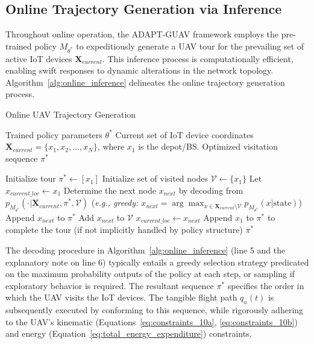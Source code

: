 \documentclass[10pt,conference,letterpaper]{IEEEtran}
\begin{document}
\subsection{Online Trajectory Generation via Inference}

Throughout online operation, the ADAPT-GUAV framework employs the pre-trained policy $M_{\theta^*}$ to expeditiously generate a UAV tour for the prevailing set of active IoT devices $\mathbf{X}_{current}$. This inference process is computationally efficient, enabling swift responses to dynamic alterations in the network topology. Algorithm~\ref{alg:online_inference} delineates the online trajectory generation process.

\begin{algorithm}[h!]
\caption{Online UAV Trajectory Generation}
\label{alg:online_inference}
\begin{algorithmic} %
\REQUIRE Trained policy parameters $\theta^*$
\REQUIRE Current set of IoT device coordinates $\mathbf{X}_{current} = \{x_1, x_2, \dots, x_N\}$, where $x_1$ is the depot/BS.
\ENSURE Optimized visitation sequence $\pi^*$

\STATE Initialize tour $\pi^* \leftarrow [x_1]$
\STATE Initialize set of visited nodes $\mathcal{V} \leftarrow \{x_1\}$
\STATE Let $x_{current\_loc} \leftarrow x_1$
    \STATE Determine the next node $x_{next}$ by decoding from $p_{M_{\theta^*}}(\cdot | \mathbf{X}_{current}, \pi^*, \mathcal{V})$
    \STATE \hspace{\algorithmicindent} (\textit{e.g., greedy: $x_{next} = \arg\max_{x \in \mathbf{X}_{current} \setminus \mathcal{V}} p_{M_{\theta^*}}(x | \text{state})$})
    \STATE Append $x_{next}$ to $\pi^*$
    \STATE Add $x_{next}$ to $\mathcal{V}$
    \STATE $x_{current\_loc} \leftarrow x_{next}$
\ENDFOR
\STATE Append $x_1$ to $\pi^*$ to complete the tour (if not implicitly handled by policy structure)
\RETURN $\pi^*$
\end{algorithmic}
\end{algorithm}


The decoding procedure in Algorithm~\ref{alg:online_inference} (line 5 and the explanatory note on line 6) typically entails a greedy selection strategy predicated on the maximum probability outputs of the policy at each step, or sampling if exploratory behavior is required. The resultant sequence $\pi^*$ specifies the order in which the UAV visits the IoT devices. The tangible flight path $q_u(t)$ is subsequently executed by conforming to this sequence, while rigorously adhering to the UAV's kinematic (Equations~\eqref{eq:constraints_10a}, \eqref{eq:constraints_10b}) and energy (Equation~\eqref{eq:total_energy_expenditure}) constraints.
\end{document}
